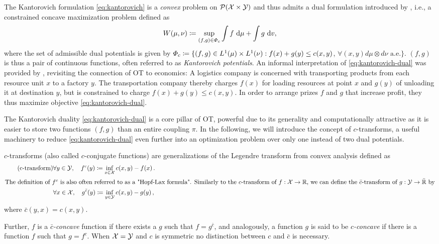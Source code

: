 The Kantorovich formulation \eqref{eq:kantorovich} is a \emph{convex} problem on ${\mathcal{P}}(\mathcal{X} \times \mathcal{Y})$ and thus admits a dual formulation introduced by \citet{kantorovich1942transfer}, i.e., a constrained concave maximization problem defined as
\begin{equation} \label{eq:kantorovich-dual}
    W(\mu, \nu)\coloneqq\sup _{(f, g) \in \Phi_{c}} \int f \mathrm{~d} \mu+\int g \mathrm{~d} v,
\end{equation}
 where the set of admissible dual potentials is given by $\Phi_c \coloneqq \{(f, g) \in L^{1}(\mu) \times L^{1}(\nu): f(x)+g(y) \leq c(x,y)$, $\forall(x, y) d\mu \otimes d\nu \text{ a.e.}\}$.
$(f, g)$ is thus a pair of continuous functions, often referred to as \emph{Kantorovich potentials}.
An informal interpretation of \eqref{eq:kantorovich-dual} was provided by \citet{caffarelli2003monge}, revisiting the connection of \acrshort{OT} to economics: 
A logistics company is concerned with transporting products from each resource unit $x$ to a factory $y$. The transportation company thereby charges $f(x)$ for loading resources at point $x$ and $g(y)$ of unloading it at destination $y$, but is constrained to charge $f(x)+g(y) \le c(x,y)$. In order to arrange prizes $f$ and $g$ that increase profit, they thus maximize objective \eqref{eq:kantorovich-dual}.

The Kantorovich duality \eqref{eq:kantorovich-dual} is a core pillar of \acrlong{OT}, powerful due to its generality and computationally attractive as it is easier to store two functions $(f, g)$ than an entire coupling $\pi$.
In the following, we will introduce the concept of $c$-transforms, a useful machinery to reduce \eqref{eq:kantorovich-dual} even further into an optimization problem over only one instead of two dual potentials.
\begin{definition}[$c$-transform] \label{eq:c-transform} 
	$c$-transforms (also called $c$-conjugate functions) are generalizations of the Legendre transform from convex analysis defined as
\begin{align*} \tag{c-transform}
	& \forall y \in {\mathcal{Y}}, \quad f^c(y) \coloneqq \inf _{x \in {\mathcal{X}}} c(x, y)-f(x) \,. \\
	\intertext{The definition of $f^c$ is also often referred to as a "Hopf-Lax formula". Similarly to the $c$-transform of $f : {\mathcal{X}} \rightarrow \mathbb{R}$, we can define the $\bar{c}$-transform of $g : {\mathcal{Y}} \rightarrow \bar{\mathbb{R}}$ by}
	& \forall x \in {\mathcal{X}}, \quad g^{\bar{c}}(y) \coloneqq \inf _{y \in {\mathcal{Y}}} c(x, y)-g(y) \,,
\end{align*}
where $\bar{c}(y, x) = c(x, y)$. 
\end{definition}
Further, $f$ is a \textit{$\bar{c}$-concave} function if there exists a $g$ such that $f = g^{\bar{c}}$, and analogously, a function $g$ is said to be \textit{$c$-concave} if there is a function $f$ such that $g = f^c$.
When ${\mathcal{X}} = {\mathcal{Y}}$ and $c$ is symmetric no distinction between $c$ and $\bar{c}$ is necessary.

